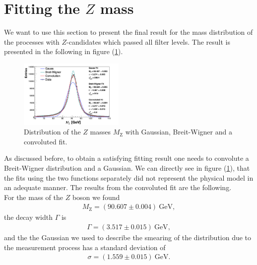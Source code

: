 \documentclass[twocolumn,
			   showpacs,%
               nofootinbib,
               aps,%
               prd,
               notitlepage,
               showkeys,
               10pt]{revtex4-1}
\begin{document}
\section{Fitting the $Z$ mass}

We want to use this section to present the final result for the mass distribution of the processes with $Z$-candidates which passed all filter levels. The result is presented in the following in figure (\ref{fig:MassDist}).

\begin{figure}[H]
	\centering
	\includegraphics[width = 0.45\textwidth]{figures/plots/ZMass_corr}
	\caption{Distribution of the $Z$ masses $M_{\mathrm{Z}}$ with Gaussian, Breit-Wigner and a convoluted fit.}
	\label{fig:MassDist}
\end{figure}

As discussed before, to obtain a satisfying fitting result one needs to convolute a Breit-Wigner distribution and a Gaussian. We can directly see in figure (\ref{fig:MassDist}), that the fits using the two functions separately did not represent the physical model in an adequate manner.
The results from the convoluted fit are the following. \\

For the mass of the $Z$ boson we found
\begin{align}
	M_{\mathrm{Z}} = (90.607 \pm 0.004) \ \text{GeV},
\end{align} 
the decay width $\Gamma$ is
\begin{align}
\Gamma = (3.517 \pm 0.015) \ \text{GeV},	
\end{align}
and the the Gaussian we used to describe the smearing of the distribution due to the measurement process has a standard deviation of 
\begin{align}
	\sigma = (1.559 \pm 0.015) \ \text{GeV}.
\end{align}
\end{document}
